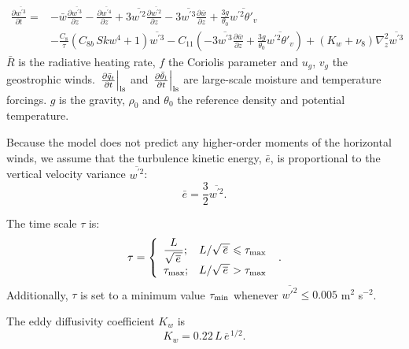 \documentclass[11pt,fleqn]{article}
\newcommand{\ptlder}[2]{\frac{\partial #1}{\partial #2}}
\begin{document}
%
\begin{equation}
\label{eq_wp3}
\begin{split}
\ptlder{\overline{w^{'3}}}{t}
= & - \bar{w}\ptlder{\overline{w^{'3}}}{z}
    - \ptlder{\overline{w^{'4}}}{z} 
    + 3\overline{w^{'2}}\ptlder{\overline{w^{'2}}}{z}
    - 3\overline{w^{'3}}\ptlder{\bar{w}}{z}
    + \frac{3g}{\theta_0} \overline{w^{'2}\theta'_v} \\
  & - \frac{C_8}{\tau}\left( C_{8b} \, Skw^4 + 1 \right) \overline{w^{'3}}
    - C_{11} \left(
                - 3 \overline{w^{'3}}\ptlder{\bar{w}}{z}
                + \frac{3g}{\theta_0} \overline{w^{'2}\theta'_v}
             \right)
    + \left( K_w + \nu_8 \right) \nabla_z^2 \overline{w^{'3}}
\end{split}
\end{equation}
%
$\bar{R}$ is the radiative heating rate, 
$f$ the Coriolis parameter and $u_g$, $v_g$ the geostrophic winds.
$\left. \ptlder{\bar{q}_t}{t} \right|_{\rm ls}$ and 
$\left. \ptlder{\bar{\theta}_l}{t} \right|_{\rm ls}$ are
large-scale moisture and temperature forcings.
$g$ is the gravity, $\rho_0$ and $\theta_0$ the reference
density and potential temperature.

Because the model does not predict any higher-order moments of the
horizontal winds, we assume that the turbulence kinetic energy, $\bar{e}$,
is proportional to the vertical velocity variance $\overline{w^{'2}}$:
%
\begin{equation}
\label{eq_tke}
\bar{e} = \frac{3}{2} \overline{w^{'2}}.
\end{equation}
%

The time scale $\tau$ is:
%
\begin{equation}
\label{eq_tau}
\tau = \left\{
\begin{array}{ll}
\displaystyle \frac{L}{\sqrt{\, \overline{e} \,}}; 
& L / \sqrt{\, \overline{e} \,} \leqslant \tau_{\rm max} \\
\displaystyle \tau_{\rm max};
&  L / \sqrt{\, \overline{e} \,} > \tau_{\rm max}
\end{array}
\right. \hbox{ .}
\end{equation}
%
Additionally, $\tau$ is set to a minimum value $\tau_{\rm min}$
whenever $\overline{w'^2} \leqslant 0.005$ m$^2$ s$^{-2}$.

The eddy diffusivity coefficient $K_w$ is
%
\begin{equation}
\label{eq_Kw}
K_w = 0.22 \, L \, \overline{e}^{\, 1/2}.
\end{equation}
\end{document}
